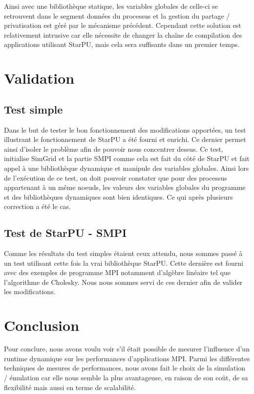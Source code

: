 \documentclass[smallextended]{svjour3}
\begin{document}
Ainsi avec une bibliothèque statique, les variables globales de
celle-ci se retrouvent dans le segment données du processus et la
gestion du partage / privatisation est géré par le mécanisme
précédent. Cependant cette solution est relativement intrusive car
elle nécessite de changer la chaîne de compilation des applications
utilisant StarPU, mais cela sera suffisants dans un premier temps. 

\section{Validation}
\label{sec-6}
\subsection{Test simple}
\label{sec-6-1}
Dans le but de tester le bon fonctionnement des modifications
apportées, un test illustrant le fonctionnement de StarPU a été
fourni et enrichi. Ce dernier permet ainsi d'isoler le problème
afin de pouvoir nous concentrer dessus. Ce test, initialise SimGrid
et la partie SMPI comme cela est fait du côté de StarPU et fait
appel à une bibliothèque dynamique et manipule des variables
globales. Ainsi lors de l'exécution de ce test, on doit pouvoir
constater que pour des processus appartenant à un même noeuds, les
valeurs des variables globales du programme et des bibliothèques
dynamiques sont bien identiques. Ce qui après plusieurs correction
a été le cas.  
\subsection{Test de StarPU - SMPI}
\label{sec-6-2}
Comme les résultats du test simples étaient ceux attendu, nous
sommes passé à un test utilisant cette fois la vrai bibliothèque
StarPU. Cette dernière est fourni avec des exemples de programme MPI
notamment d'algèbre linéaire tel que l'algorithme de Cholesky. Nous
nous sommes servi de ces dernier afin de valider les
modifications.

\section{Conclusion}
\label{sec-7}
Pour conclure, nous avons voulu voir s'il était possible de mesurer
l'influence d'un runtime dynamique sur les performances
d'applications MPI. Parmi les différentes techniques de mesures de
performances, nous avons fait le choix de la simulation / émulation
car elle nous semble la plus avantageuse, en raison de son coût, de
sa flexibilité mais aussi en terme de scalabilité.  
\end{document}

